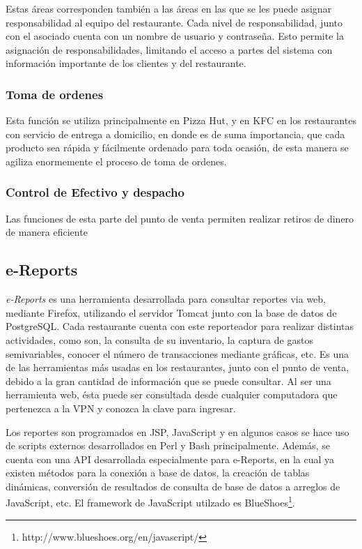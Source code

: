 Estas áreas corresponden también a las áreas en las que se les puede asignar responsabilidad al equipo del restaurante. Cada nivel de responsabilidad, junto con el asociado cuenta con un nombre de usuario y contraseña. Esto permite la asignación de responsabilidades, limitando el acceso a partes del sistema con información importante de los clientes y del restaurante.

\subsubsection{Toma de ordenes}
\label{sec:sus_toma_ordenes}

Esta función se utiliza principalmente en Pizza Hut, y en KFC en los restaurantes con servicio de entrega a domicilio, en donde es de suma importancia, que cada producto sea rápida y fácilmente ordenado para toda ocasión, de esta manera se agiliza enormemente el proceso de toma de ordenes.

\subsubsection{Control de Efectivo y despacho}
\label{sec:sus_control_efectivo}

Las funciones de esta parte del punto de venta permiten realizar retiros de dinero de manera eficiente 

\subsection{e-Reports}
\label{sec:ereports}

\textit{e-Reports} es una herramienta desarrollada para consultar reportes via web, mediante Firefox, utilizando el servidor Tomcat junto con la base de datos de PostgreSQL. Cada restaurante cuenta con este reporteador para realizar distintas actividades, como son, la consulta de su inventario, la captura de gastos semivariables, conocer el número de transacciones mediante gráficas, etc. Es una de las herramientas más usadas en los restaurantes, junto con el punto de venta, debido a la gran cantidad de información que se puede consultar. Al ser una herramienta web, ésta puede ser consultada desde cualquier computadora que pertenezca a la VPN y conozca la clave para ingresar.

Los reportes son programados en JSP, JavaScript y en algunos casos se hace uso de scripts externos desarrollados en Perl y Bash principalmente. Además, se cuenta con una API desarrollada especialmente para e-Reports, en la cual ya existen métodos para la conexión a base de datos, la creación de tablas dinámicas, conversión de resultados de consulta de base de datos a arreglos de JavaScript, etc. El framework de JavaScript utilzado es BlueShoes\footnote{http://www.blueshoes.org/en/javascript/}.

